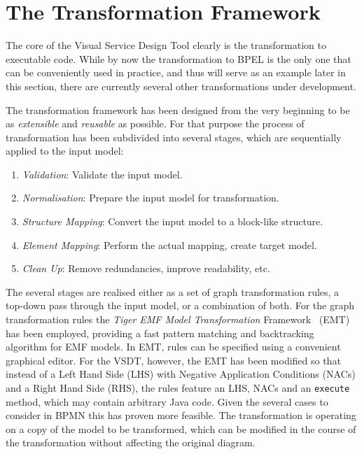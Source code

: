 \section{The Transformation Framework}
\label{sec:trafo}

The core of the Visual Service Design Tool clearly is the transformation to executable code.  While by now the transformation to BPEL is the only one that can be conveniently used in practice, and thus will serve as an example later in this section, there are currently several other transformations under development.

The transformation framework has been designed from the very beginning to be as \emph{extensible} and \emph{reusable} as possible.  For that purpose the process of transformation has been subdivided into several stages, which are sequentially applied to the input model:
\begin{enumerate}
	\item \emph{Validation}: Validate the input model.
	\item \emph{Normalisation}: Prepare the input model for transformation.
	\item \emph{Structure Mapping}: Convert the input model to a block-like structure.
	\item \emph{Element Mapping}: Perform the actual mapping, create target model.
	\item \emph{Clean Up}: Remove redundancies, improve readability, etc.
\end{enumerate}

The several stages are realised either as a set of graph transformation rules, a top-down pass through the input model, or a combination of both.  For the graph transformation rules the \emph{Tiger EMF Model Transformation} Framework~\cite{biermann2006graphica} (EMT) has been employed, providing a fast pattern matching and backtracking algorithm for EMF models.  In EMT, rules can be specified using a convenient graphical editor.  For the VSDT, however, the EMT has been modified so that instead of a Left Hand Side (LHS) with Negative Application Conditions (NACs) and a Right Hand Side (RHS), the rules feature an LHS, NACs and an \texttt{execute} method, which may contain arbitrary Java code.  Given the several cases to consider in BPMN this has proven more feasible.  The transformation is operating on a copy of the model to be transformed, which can be modified in the course of the transformation without affecting the original diagram.


